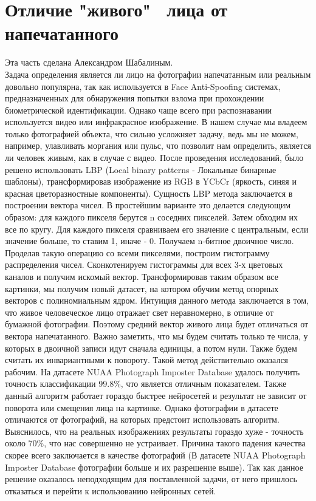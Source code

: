 \documentclass[a4paper,14pt]{extarticle}
\begin{document}
    \section{Отличие "живого" \, лица от напечатанного}
    Эта часть сделана Александром Шабалиным.\\
    Задача определения является ли лицо на фотографии напечатанным или реальным довольно популярна, так как используется в Face Anti-Spoofing системах, предназначенных для обнаружения попытки взлома при прохождении биометрической идентификации. Однако чаще всего при распознавании используется видео или инфракрасное изображение. В нашем случае мы владеем только фотографией объекта, что сильно усложняет задачу, ведь мы не можем, например, улавливать моргания или пульс, что позволит нам определить, является ли человек живым, как в случае с видео.
    После проведения исследований, было решено использовать LBP (Local binary patterns - Локальные бинарные шаблоны), трансформировав изображение из RGB в YCbCr (яркость, синяя и красная цветоразностные компоненты). Сущность LBP метода заключается в построении вектора чисел. В простейшим варианте это делается следующим образом: для каждого пикселя берутся n соседних пикселей. Затем обходим их все по кругу. Для каждого пикселя сравниваем его значение с центральным, если значение больше, то ставим 1, иначе - 0. Получаем n-битное двоичное число. Проделав такую операцию со всеми пикселями, построим гистограмму распределения чисел. Сконкотенируем гистограммы для всех 3-х цветовых каналов и получим искомый вектор. Трансформировав таким образом все картинки, мы получим новый датасет, на котором обучим метод опорных векторов с полиномиальным ядром.
    Интуиция данного метода заключается в том, что живое человеческое лицо отражает свет неравномерно, в отличие от бумажной фотографии. Поэтому средний вектор живого лица будет отличаться от вектора напечатанного. Важно заметить, что мы будем считать только те числа, у которых в двоичной записи идут сначала единицы, а потом нули. Также будем считать их инвариантными к повороту.
    Такой метод действительно оказался рабочим. На датасете NUAA Photograph Imposter Database удалось получить точность классификации 99.8\%, что является отличным показателем. Также данный алгоритм работает гораздо быстрее нейросетей и результат не зависит от поворота или смещения лица на картинке. Однако фотографии в датасете отличаются от фотографий, на которых предстоит использовать алгоритм. Выяснилось, что на реальных изображениях результаты гораздо хуже - точность около 70\%, что нас совершенно не устраивает. Причина такого падения качества скорее всего заключается в качестве фотографий (В датасете NUAA Photograph Imposter Database фотографии больше и их разрешение выше). Так как данное решение оказалось неподходящим для поставленной задачи, от него пришлось отказаться и перейти к использованию нейронных сетей.
\end{document}
